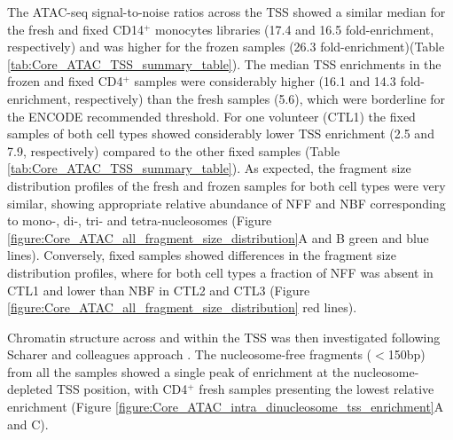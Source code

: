 The ATAC-seq signal-to-noise ratios across the TSS showed a similar median for the fresh and fixed CD14$^+$ monocytes libraries (17.4 and 16.5 fold-enrichment, respectively) and was higher for the frozen samples (26.3 fold-enrichment)(Table \ref{tab:Core_ATAC_TSS_summary_table}). The median TSS enrichments in the frozen and fixed CD4$^+$ samples were considerably higher (16.1 and 14.3 fold-enrichment, respectively) than the fresh samples (5.6), which were borderline for the ENCODE recommended threshold. For one volunteer (CTL1) the fixed samples of both cell types showed considerably lower TSS enrichment (2.5 and 7.9, respectively) compared to the other fixed samples (Table \ref{tab:Core_ATAC_TSS_summary_table}). As expected, the fragment size distribution profiles of the fresh and frozen samples for both cell types were very similar, showing appropriate relative abundance of NFF and NBF corresponding to mono-, di-, tri- and tetra-nucleosomes (Figure \ref{figure:Core_ATAC_all_fragment_size_distribution}A and B green and blue lines). Conversely, fixed samples showed differences in the fragment size distribution profiles, where for both cell types a fraction of NFF was absent in CTL1 and lower than NBF in CTL2 and CTL3 (Figure \ref{figure:Core_ATAC_all_fragment_size_distribution} red lines). 


Chromatin structure across and within the TSS was then investigated following Scharer and colleagues approach \parencite{Scharer2016}. The nucleosome-free fragments ($<$150bp) from all the samples showed a single peak of enrichment at the nucleosome-depleted TSS position, with CD4$^+$ fresh samples presenting the lowest relative enrichment (Figure \ref{figure:Core_ATAC_intra_dinucleosome_tss_enrichment}A and C).

